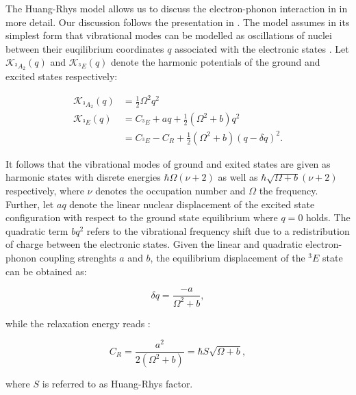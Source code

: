     The Huang-Rhys model allows us to discuss the electron-phonon interaction in \sivs in more detail. Our discussion follows the presentation in \cite{janine::213}. The model assumes in its simplest form that vibrational modes can be modelled as oscillations of nuclei between their euqilibrium coordinates $q$ associated with the electronic states \cite{janine::thesis}. Let $\mathcal{K}_{{}^{3}A_{2}}(q)$ and $\mathcal{K}_{{}^{3}E}(q)$ denote the harmonic potentials of the ground and excited states respectively:

    \begin{align}
      \mathcal{K}_{{}^{3}A_{2}}(q) & = \frac{1}{2} \Omega^2 q^2 \\
      \mathcal{K}_{{}^{3}E}(q) & = C_{{}^{3}E} + aq + \frac{1}{2} (\Omega^2 + b)q^2 \\
       & = C_{{}^{3}E} - C_R + \frac{1}{2} (\Omega^2 + b)(q - \delta q)^2.
    \end{align}

    It follows that the vibrational modes of ground and exited states are given as harmonic states with disrete energies $\hbar \Omega (\nu + 2)$ as well as $\hbar \sqrt{\Omega + b} (\nu + 2)$ respectively, where $\nu$ denotes the occupation number and $\Omega$ the frequency.
    Further, let $aq$ denote the linear nuclear displacement of the excited state configuration with respect to the ground state equilibrium where $q = 0$ holds.
    The quadratic term $bq^2$ refers to the vibrational frequency shift due to a redistribution of charge between the electronic states.
    Given the linear and quadratic electron-phonon coupling strenghts $a$ and $b$, the equilibrium displacement of the ${}^{3}E$ state can be obtained as:

    \begin{equation}
      \delta q = \frac{-a}{\Omega^2 + b },
    \end{equation}

    while the relaxation energy reads \cite{janine::213}:

    \begin{equation}
      C_R = \frac{a^2}{2 (\Omega^2 + b)} = \hbar S \sqrt{\Omega + b},
    \end{equation}


   where $S$ is referred to as Huang-Rhys factor.

